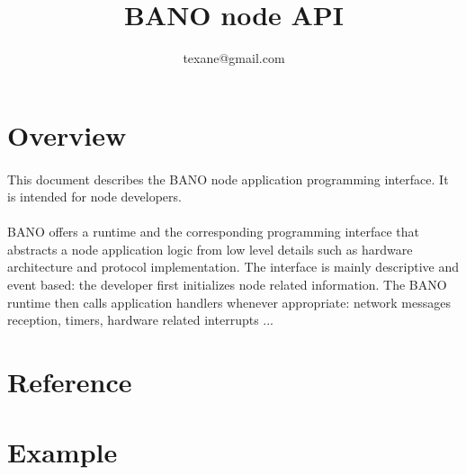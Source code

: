 \documentclass[a4paper, 11pt]{article}
\begin{document}
\title{BANO node API}
\author{texane@gmail.com}
\date{}

\maketitle



\clearpage
\section{Overview}

\paragraph{}
This document describes the BANO node application programming interface.
It is intended for node developers.

\paragraph{}
BANO offers a runtime and the corresponding programming interface that
abstracts a node application logic from low level details such as hardware
architecture and protocol implementation. The interface is mainly descriptive
and event based: the developer first initializes node related information.
The BANO runtime then calls application handlers whenever appropriate:
network messages reception, timers, hardware related interrupts ...


\clearpage
\section{Reference}
\paragraph{}


\clearpage
\section{Example}
\paragraph{}
\end{document}
